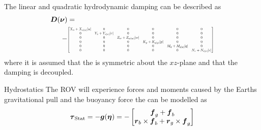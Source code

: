 \documentclass[11pt,aspectratio=169]{beamer}
\newcommand\scalemath[2]{\scalebox{#1}{\mbox{\ensuremath{\displaystyle #2}}}}
\begin{document}
\begin{frame}
The linear and quadratic hydrodynamic damping can be described as
\begin{align}
\begin{split}
    \damping(\nuVector) &= \\
    -& \scalemath{0.5}{\begin{bmatrix}
        \Xu+\Xuabsu\abs{u} & 0 & 0 & 0 & 0 & 0 \\
        0 & \Yv+\Yvabsv\abs{v} & 0 & 0 & 0 & 0 \\
        0 & 0 & \Zw+\Zwabsw\abs{w} & 0 & 0 & 0 \\
        0 & 0 & 0 & \Kp+\Kpabsp\abs{p} & 0 & 0 \\
        0 & 0 & 0 & 0 & \Mq+\Mqabsq\abs{q} & 0 \\
        0 & 0 & 0 & 0 & 0 & \Nr+\Nrabsr\abs{r} \\
    \end{bmatrix}}
    \end{split}
\end{align}
where it is assumed that the \abbrROV is symmetric about the $xz$-plane and that the damping is decoupled.
\end{frame}

\begin{frame}{Hydrostatics}
The ROV will experience forces and moments caused by the Earths gravitational pull and the buoyancy force the can be modelled as 
\begin{equation}\label{eq:stat}
\boldsymbol{\tau}_{\text{Stat}}=-\boldsymbol{g}(\boldsymbol{\eta}) = - \begin{bmatrix}
    \boldsymbol{f}_g + \boldsymbol{f}_b \\
    \boldsymbol{r}_b \times \boldsymbol{f}_b + \boldsymbol{r}_g \times \boldsymbol{f}_g 
     \end{bmatrix}
\end{equation} 
\end{frame}
\end{document}
